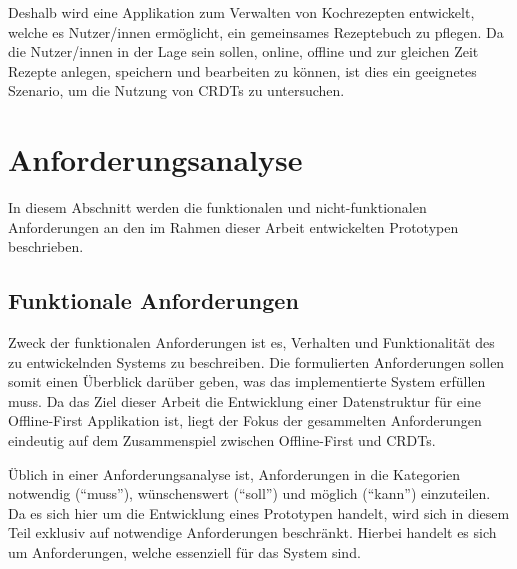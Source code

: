\documentclass[a4paper, 12pt]{scrreprt}
\begin{document}
Deshalb wird eine Applikation zum Verwalten von Kochrezepten entwickelt, welche es Nutzer/innen ermöglicht, ein gemeinsames Rezeptebuch zu pflegen. Da die Nutzer/innen in der Lage sein sollen, online, offline und zur gleichen Zeit Rezepte anlegen, speichern und bearbeiten zu können, ist dies ein geeignetes Szenario, um die Nutzung von \acp{CRDT} zu untersuchen. 

\section{Anforderungsanalyse}
\label{sec:anforderungsanalyse}

In diesem Abschnitt werden die funktionalen und nicht-funktionalen Anforderungen an den im Rahmen dieser Arbeit entwickelten Prototypen beschrieben.

\subsection{Funktionale Anforderungen}
\label{sec:funktionaleAnforderungen}
Zweck der funktionalen Anforderungen ist es, Verhalten und Funktionalität des zu entwickelnden Systems zu beschreiben. Die formulierten Anforderungen sollen somit einen Überblick darüber geben, was das implementierte System erfüllen muss. Da das Ziel dieser Arbeit die Entwicklung einer Datenstruktur für eine Offline-First Applikation ist, liegt der Fokus der gesammelten Anforderungen eindeutig auf dem Zusammenspiel zwischen Offline-First und \acp{CRDT}.

Üblich in einer Anforderungsanalyse ist, Anforderungen in die Kategorien notwendig (\enquote{muss}), wünschenswert (\enquote{soll}) und möglich (\enquote{kann}) einzuteilen. Da es sich hier um die Entwicklung eines Prototypen handelt, wird sich in diesem Teil exklusiv auf notwendige Anforderungen beschränkt. Hierbei handelt es sich um Anforderungen, welche essenziell für das System sind.
\end{document}
